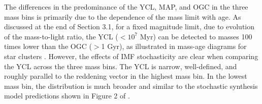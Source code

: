 \documentclass[linenumbers]{aastex63}
\begin{document}
{The differences in the predominance of the YCL, MAP, and OGC in the three mass bins is primarily due to the dependence of the mass limit with age. As discussed at the end of Section 3.1, for a fixed magnitude limit, due to evolution of the mass-to-light ratio, the YCL ($<10^7$ Myr) can be detected to masses 100 times lower than the OGC ($>$1 Gyr), as illustrated in mass-age diagrams for star clusters \citep[e.g.,][]{cook_star_2019}.
However, the effects of IMF stochasticity are clear when comparing the YCL across the three mass bins.  The YCL is narrow, well-defined, and roughly parallel to the reddening vector in the highest mass bin.  In the lowest mass bin, the distribution is much broader and similar to the stochastic synthesis model predictions shown in Figure 2 of \citet{fouesneau_analyzing_2012}.



}
\end{document}
